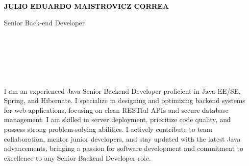 \documentclass[9pt]{developercv} %
\begin{document}

\begin{minipage}[t]{0.5\textwidth} 
	\vspace{-\baselineskip} %
	
	{ \fontsize{16}{20} \textcolor{black}{\textbf{\MakeUppercase{Julio Eduardo Maistrovicz Correa}}}} %
	
	\vspace{6pt}
	
	{\Large Senior Back-end Developer } %
\end{minipage}
\hfill
\begin{minipage}[t]{0.2\textwidth} %
	\vspace{-\baselineskip} %
	
    \\
    \\
	
\end{minipage}
\begin{minipage}[t]{0.27\textwidth} %
	\vspace{-\baselineskip} %
	
	\\	
    \\    
    
\end{minipage}
\begin{minipage}[t]{0.46\textwidth}
	\vspace{-6pt}
 
    I am an experienced Java Senior Backend Developer proficient in Java EE/SE, Spring, and Hibernate. I specialize in designing and optimizing backend systems for web applications, focusing on clean RESTful APIs and secure database management. I am skilled in server deployment, prioritize code quality, and possess strong problem-solving abilities. I actively contribute to team collaboration, mentor junior developers, and stay updated with the latest Java advancements, bringing a passion for software development and commitment to excellence to any Senior Backend Developer role.
\end{minipage}
\end{document}
